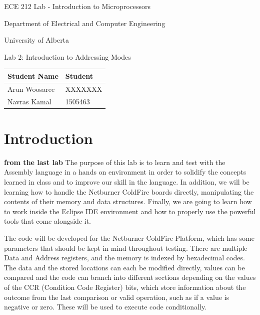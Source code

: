 \documentclass[letterpaper]{article}
\begin{document}
  \begin{titlepage}
    \begin{center}

      \LARGE
      ECE 212 Lab - Introduction to Microprocessors

      Department of Electrical and Computer Engineering

      University of Alberta

      \vspace{2cm}

      Lab 2: Introduction to Addressing Modes

      \vspace{5cm}
      \Large

      \begin{tabular}{ | m{5cm} | m{5cm} | }
        \hline
        Student Name & Student \\
        \hline
        Arun Woosaree & XXXXXXX \\
        \hline
        Navras Kamal & 1505463 \\
        \hline
      \end{tabular}

    \end{center}
\end{titlepage}


\tableofcontents

\newpage

\section{Introduction}
\textbf{from the last lab}
  The purpose of this lab is to learn and test with the Assembly language in a hands on environment
  in order to solidify the concepts learned in class and to improve our skill in the language.  In
  addition, we will be learning how to handle the Netburner ColdFire boards directly, manipulating
  the contents of their memory and data structures.  Finally, we are going to learn how to work inside
  the Eclipse IDE environment and how to properly use the powerful tools that come alongside it.

  The code will be developed for the Netburner ColdFire Platform, which has some parameters that should
  be kept in mind throughout testing.  There are multiple Data and Address registers, and the memory
  is indexed by hexadecimal codes.  The data and the stored locations can each be modified directly, values
  can be compared and the code can branch into different sections depending on the values of the CCR
  (Condition Code Register) bits,
  which store information about the outcome from the last comparison or valid operation, such as if a
  value is negative or zero.  These will be used to execute code conditionally.
\end{document}
